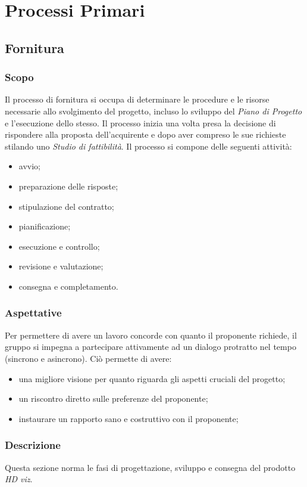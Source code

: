 \section{Processi Primari}
	\subsection{Fornitura}
		\subsubsection{Scopo}
		Il processo di fornitura si occupa di determinare le procedure e le risorse necessarie allo svolgimento del progetto, incluso lo sviluppo del \textit{Piano di Progetto} e l'esecuzione dello stesso. Il processo inizia una volta presa la decisione di rispondere alla proposta dell'acquirente e dopo aver compreso le sue richieste stilando uno \textit{Studio di fattibilità}. Il processo si compone delle seguenti attività:
		\begin{itemize}
		    \item avvio;
		    \item preparazione delle risposte;
		    \item stipulazione del contratto;
		    \item pianificazione;
		    \item esecuzione e controllo;
		    \item revisione e valutazione;
		    \item consegna e completamento.
		\end{itemize}
		
		\subsubsection{Aspettative}
		Per permettere di avere un lavoro concorde con quanto il proponente richiede, il gruppo si impegna a partecipare attivamente ad un dialogo protratto nel tempo (sincrono e asincrono). Ciò permette di avere:
		\begin{itemize}
			\item una migliore visione per quanto riguarda gli aspetti cruciali del progetto;
			\item un riscontro diretto sulle preferenze del proponente;
			\item instaurare un rapporto sano e costruttivo con il proponente;
		\end{itemize}
		
		\subsubsection{Descrizione}
		Questa sezione norma le fasi di progettazione, sviluppo e consegna del prodotto \textit{HD viz}. 

